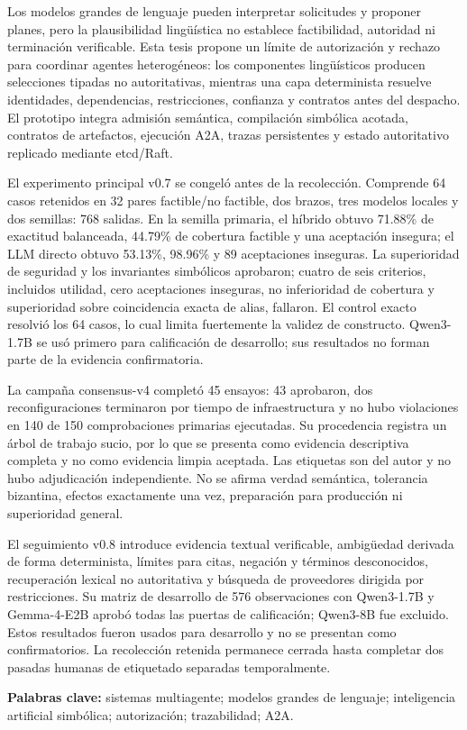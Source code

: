 \begin{abstractES}
\enlargethispage{4\baselineskip}

Los modelos grandes de lenguaje pueden interpretar solicitudes y proponer planes, pero la plausibilidad ling\"u\'istica no establece factibilidad, autoridad ni terminaci\'on verificable. Esta tesis propone un l\'imite de autorizaci\'on y rechazo para coordinar agentes heterog\'eneos: los componentes ling\"u\'isticos producen selecciones tipadas no autoritativas, mientras una capa determinista resuelve identidades, dependencias, restricciones, confianza y contratos antes del despacho. El prototipo integra admisi\'on sem\'antica, compilaci\'on simb\'olica acotada, contratos de artefactos, ejecuci\'on A2A, trazas persistentes y estado autoritativo replicado mediante etcd/Raft.

El experimento principal v0.7 se congel\'o antes de la recolecci\'on. Comprende 64 casos retenidos en 32 pares factible/no factible, dos brazos, tres modelos locales y dos semillas: 768 salidas. En la semilla primaria, el h\'ibrido obtuvo 71.88\% de exactitud balanceada, 44.79\% de cobertura factible y una aceptaci\'on insegura; el LLM directo obtuvo 53.13\%, 98.96\% y 89 aceptaciones inseguras. La superioridad de seguridad y los invariantes simb\'olicos aprobaron; cuatro de seis criterios, incluidos utilidad, cero aceptaciones inseguras, no inferioridad de cobertura y superioridad sobre coincidencia exacta de alias, fallaron. El control exacto resolvi\'o los 64 casos, lo cual limita fuertemente la validez de constructo. Qwen3-1.7B se us\'o primero para calificaci\'on de desarrollo; sus resultados no forman parte de la evidencia confirmatoria.

La campa\~na consensus-v4 complet\'o 45 ensayos: 43 aprobaron, dos reconfiguraciones terminaron por tiempo de infraestructura y no hubo violaciones en 140 de 150 comprobaciones primarias ejecutadas. Su procedencia registra un \'arbol de trabajo sucio, por lo que se presenta como evidencia descriptiva completa y no como evidencia limpia aceptada. Las etiquetas son del autor y no hubo adjudicaci\'on independiente. No se afirma verdad sem\'antica, tolerancia bizantina, efectos exactamente una vez, preparaci\'on para producci\'on ni superioridad general.

El seguimiento v0.8 introduce evidencia textual verificable, ambig\"uedad derivada de forma determinista, l\'imites para citas, negaci\'on y t\'erminos desconocidos, recuperaci\'on lexical no autoritativa y b\'usqueda de proveedores dirigida por restricciones. Su matriz de desarrollo de 576 observaciones con Qwen3-1.7B y Gemma-4-E2B aprob\'o todas las puertas de calificaci\'on; Qwen3-8B fue excluido. Estos resultados fueron usados para desarrollo y no se presentan como confirmatorios. La recolecci\'on retenida permanece cerrada hasta completar dos pasadas humanas de etiquetado separadas temporalmente.

\noindent\textbf{Palabras clave:} sistemas multiagente; modelos grandes de lenguaje; inteligencia artificial simb\'olica; autorizaci\'on; trazabilidad; A2A.

\end{abstractES}

